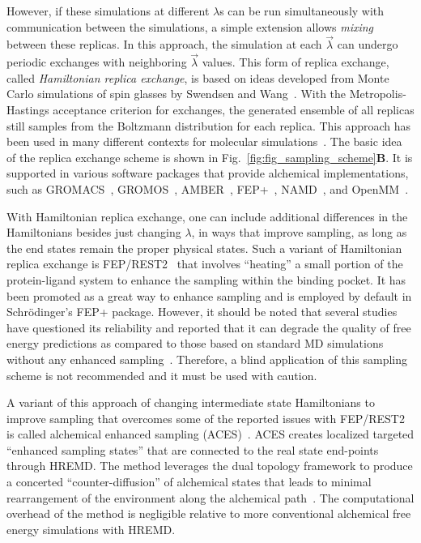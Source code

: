 \documentclass[9pt,bestpractices]{livecoms}
\begin{document}
However, if these simulations at different $\lambda$s can be run simultaneously with communication between the simulations, a simple extension allows \textit{mixing} between these replicas. In this approach, the simulation at each $\vec{\lambda}$ can undergo periodic exchanges with neighboring $\vec{\lambda}$ values. This form of replica exchange, called \textit{Hamiltonian replica exchange}, is based on ideas developed from Monte Carlo simulations of spin glasses by Swendsen and Wang~\cite{swendsen1986replica}. With the Metropolis-Hastings acceptance criterion for exchanges, the generated ensemble of all replicas still samples from the Boltzmann distribution for each replica. This approach has been used in many different contexts for molecular simulations~\cite{sugita2000multidimensional,sugita1999replicaexchange, woods2003development, jiang2010free}. The basic idea of the replica exchange scheme is shown in Fig.~\ref{fig:fig_sampling_scheme}\textbf{B}. It is supported in various software packages that provide alchemical implementations, such as GROMACS~\cite{aldeghi2015accurate}, GROMOS~\cite{hritz2008hamiltonian,hritz2007optimization},
AMBER~\cite{Lee_JChemInfModel_2020_v60_p5595,Case_JChemInfModel_2025_v65_p7835}, FEP+~\cite{wang2015accurate}, NAMD~\cite{jiang2019computing}, and OpenMM~\cite{rufa2020chemical,azimi2022relative}.

With Hamiltonian replica exchange, one can include additional differences in the Hamiltonians besides just changing $\lambda$, in ways that improve sampling, as long as the end states remain the proper physical states. Such a variant of Hamiltonian replica exchange is FEP/REST2~\cite{rest2, feprest} that involves ``heating'' a small portion of the protein-ligand system to enhance the sampling within the binding pocket. It has been promoted as a great way to enhance sampling and is employed by default in Schr\"{o}dinger's FEP+ package. However, it should be noted that several studies have questioned its reliability and reported that it can degrade the quality of free energy predictions as compared to those based on standard MD simulations without any enhanced sampling~\cite{wan2020fep+, bhati2022}. Therefore, a blind application of this sampling scheme is not recommended and it must be used with caution. 

A variant of this approach of changing intermediate state Hamiltonians to improve sampling that overcomes some of the reported issues with FEP/REST2 is called alchemical enhanced sampling (ACES)~\cite{lee2023aces}. ACES creates localized targeted ``enhanced sampling states'' that are connected to the real state end-points through HREMD.  The method leverages the dual topology framework to produce a concerted ``counter-diffusion'' of alchemical states that leads to minimal rearrangement of the environment along the alchemical path~\cite{York_ACSPhysChemAu_2023_v3_p478}. The computational overhead of the method is negligible relative to more conventional alchemical free energy simulations with HREMD.
\end{document}
